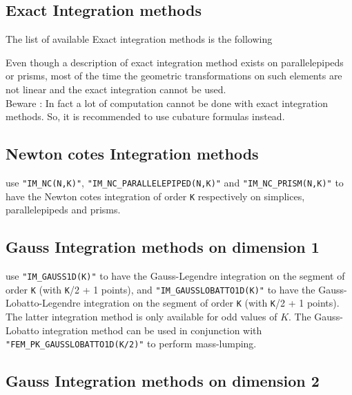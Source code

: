 \documentclass[10pt,a4paper]{article}
\begin{document}
\subsection{Exact Integration methods}

The list of available Exact integration methods is the following



Even though a description of exact integration method exists on parallelepipeds or prisms, most of the time the geometric transformations on such elements are not linear and the exact integration cannot be used.\\

Beware : In fact a lot of computation cannot be done with exact integration methods. So, it is recommended to use cubature formulas instead.

\subsection{Newton cotes Integration methods}

use {\tt "IM\_NC(N,K)"}, {\tt "IM\_NC\_PARALLELEPIPED(N,K)"}
and {\tt "IM\_NC\_PRISM(N,K)"} to have the Newton cotes integration of order {\tt K} respectively on simplices, parallelepipeds and prisms.


\subsection{Gauss Integration methods on dimension 1}

use {\tt "IM\_GAUSS1D(K)"} to have the Gauss-Legendre integration on the segment of order {\tt K} (with {\tt K}/2 + 1 points), and {\tt "IM\_GAUSSLOBATTO1D(K)"} to have the Gauss-Lobatto-Legendre integration on the segment of order {\tt K} (with {\tt K}/2 + 1 points). The latter integration method is only available for odd values of $K$. The Gauss-Lobatto integration method can be used in conjunction with {\tt "FEM\_PK\_GAUSSLOBATTO1D(K/2)"} to perform mass-lumping.

\subsection{Gauss Integration methods on dimension 2}
\end{document}
